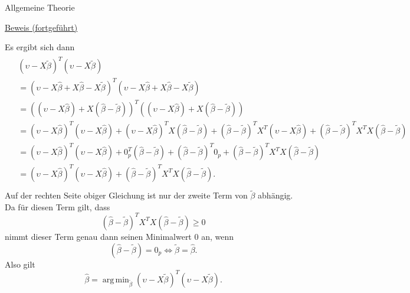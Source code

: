 \documentclass[
  8pt,
  ignorenonframetext,
]{beamer}
\DeclareMathOperator*{\argmin}{arg\,min}
\begin{document}
\begin{frame}{Allgemeine Theorie}
\protect\hypertarget{allgemeine-theorie-2}{}
\footnotesize

\underline{Beweis (fortgeführt)}

Es ergibt sich dann \begin{align*}
\begin{split}
& (\upsilon-X\tilde{\beta})^T(\upsilon- X\tilde{\beta}) \\
& = (\upsilon-X\hat{\beta} + X\hat{\beta}- X\tilde{\beta})^T(\upsilon-X\hat{\beta} + X\hat{\beta} - X\tilde{\beta}) \\
& = ((\upsilon- X\hat{\beta}) + X(\hat{\beta}-\tilde{\beta}))^T((\upsilon-X\hat{\beta}) + X(\hat{\beta} -\tilde{\beta})) \\
& = (\upsilon-X\hat{\beta})^T(\upsilon- X\hat{\beta}) + (\upsilon -  X\hat{\beta})^T X(\hat{\beta} -\tilde{\beta})
     + (\hat{\beta}-\tilde{\beta})^TX^T(\upsilon- X\hat{\beta})
     + (\hat{\beta}-\tilde{\beta})^TX^TX(\hat{\beta} -\tilde{\beta}) \\
& = (\upsilon -  X\hat{\beta})^T(\upsilon -  X\hat{\beta})  +  0_p^T(\hat{\beta} -\tilde{\beta})
     + (\hat{\beta} -\tilde{\beta})^T0_p
     + (\hat{\beta} -\tilde{\beta})^TX^TX(\hat{\beta} -\tilde{\beta}) \\
&  = (\upsilon- X\hat{\beta})^T(\upsilon-X\hat{\beta}) + (\hat{\beta} -\tilde{\beta})^TX^TX(\hat{\beta} -\tilde{\beta}). \\
\end{split}
\end{align*} Auf der rechten Seite obiger Gleichung ist nur der zweite
Term von \(\tilde{\beta}\) abhängig. Da für diesen Term gilt, dass
\begin{equation}
(\hat{\beta} -\tilde{\beta})^TX^TX(\hat{\beta} -\tilde{\beta}) \ge 0
\end{equation} nimmt dieser Term genau dann seinen Minimalwert 0 an,
wenn \begin{equation}
(\hat{\beta} -\tilde{\beta}) = 0_p \Leftrightarrow \tilde{\beta} = \hat{\beta}.
\end{equation} Also gilt \begin{equation}
\hat{\beta} = \argmin_{\tilde{\beta}} (\upsilon -  X\tilde{\beta})^T(\upsilon -  X\tilde{\beta}).
\end{equation}
\end{frame}
\end{document}
